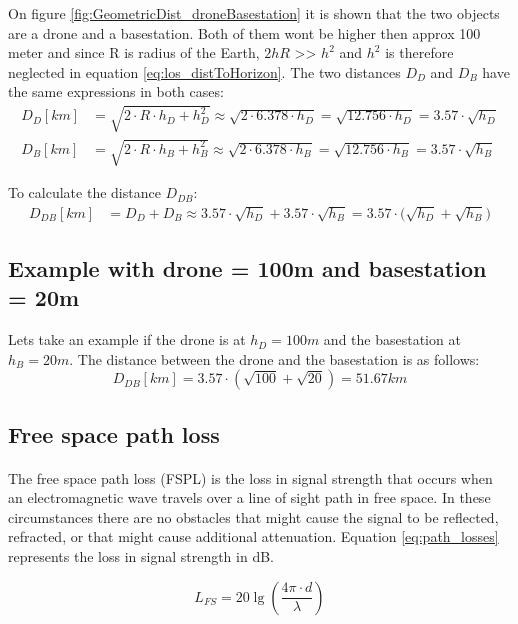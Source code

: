 On figure \ref{fig:GeometricDist_droneBasestation} it is shown that the two objects are a drone and a basestation. Both of them wont be higher then approx 100 meter and since R is radius of the Earth, $2hR$ >> $h^2$ and $h^2$ is therefore neglected in equation \ref{eq:los_distToHorizon}. The two distances $D_D$ and $D_B$ have the same expressions in both cases:
\begin{align*}
	D_D [km] &= \sqrt{2\cdot R \cdot h_D + h_{D}^2} \approx \sqrt{2\cdot 6.378\cdot h_D} = \sqrt{12.756\cdot h_D} = 3.57\cdot \sqrt{h_D} \\
	D_B [km] &= \sqrt{2\cdot R \cdot h_B + h_{B}^2} \approx \sqrt{2\cdot 6.378\cdot h_B} = \sqrt{12.756\cdot h_B} = 3.57\cdot \sqrt{h_B}
\end{align*}

To calculate the distance $D_{DB}$:
\begin{align}
	D_{DB}[km]	 &= D_D + D_B \approx 3.57\cdot \sqrt{h_D} + 3.57\cdot \sqrt{h_B} = {3.57\cdot (\sqrt{h_D} + \sqrt{h_B}} )
\end{align}

\subsection{Example with drone = 100m and basestation = 20m}
Lets take an example if the drone is at $h_D = 100m$ and the basestation at $h_B = 20m$. The distance between the drone and the basestation is as follows:
\begin{equation*}
	D_{DB}[km] = 3.57\cdot (\sqrt{100} + \sqrt{20}) = 51.67km
\end{equation*}

\subsection{Free space path loss}\label{subsec:path_loss}
\paragraph{}
The free space path loss (FSPL) is the loss in signal strength that occurs when an electromagnetic wave travels over a line of sight path in free space. In these circumstances there are no obstacles that might cause the signal to be reflected, refracted, or that might cause additional attenuation. Equation \ref{eq:path_losses} represents the loss in signal strength in dB.

\begin{equation}\label{eq:path_losses}
	L_{FS} = 20\lg\left (\frac{4\pi \cdot d}{\lambda} \right)
\end{equation}

